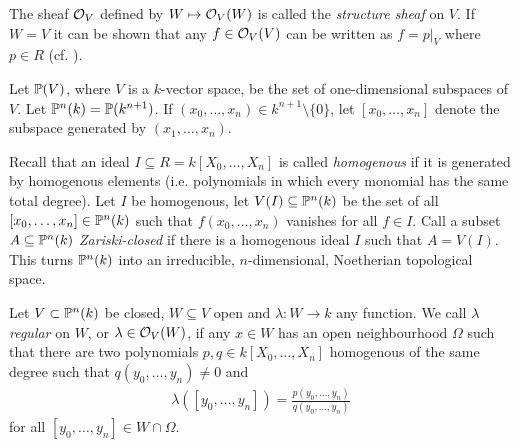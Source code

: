 \documentclass[a4paper,parskip=full,numbers=enddot]{scrreprt}
\begin{document}
\begin{defi}
\begin{example}
     The sheaf $\mathcal{O}_V$ defined by $W\mapsto \mathcal{O}_V(W)$ is called the \emph{structure sheaf} on $V$. If $W=V$ it can be shown that any $f\in \mathcal{O}_V(V)$ can be written as $f=p|_V$ where $p\in R$ (cf. \cite[Proposition 2.2.2]{alg1}).
     
    \end{example}
    
\begin{example}
    Let $\mathbb{P}(V)$, where $V$ is a $k$-vector space, be the set of one-dimensional subspaces of $V$. Let $\mathbb{P}^n(k) = \mathbb{P}(k^{n+1})$. If $(x_0,\ldots,x_n)\in k^{n+1}\setminus\{0\}$, let $[x_0,\ldots,x_n]$ denote the subspace generated by $(x_1,\ldots, x_n)$.
     
     Recall that an ideal $I\subseteq R=k[X_0,\ldots,X_n]$ is called \emph{homogenous} if it is generated by homogenous elements (i.e. polynomials in which every monomial has the same total degree). Let $I$ be homogenous, let $V(I)\subseteq \mathbb{P}^n(k)$ be the set of all $[x_0, \ldots, x_n]\in\mathbb{P}^n(k)$ such that $f(x_0,\ldots, x_n)$ vanishes for all $f\in I$. Call a subset $A\subseteq\mathbb{P}^n(k)$ \emph{Zariski-closed} if there is a homogenous ideal $I$ such that $A= V(I)$. This turns $\mathbb{P}^n(k)$ into an irreducible, $n$-dimensional, Noetherian topological space.
     
     Let $V\subset \mathbb{P}^n(k)$ be closed, $W\subseteq V$ open and $\lambda\colon W\to k$ any function. We call $\lambda$ \emph{regular} on $W$, or $\lambda \in \mathcal{O}_V(W)$, if any $x\in W$ has an open neighbourhood $\Omega$ such that there are two polynomials $p,q\in k[X_0,\ldots,X_n]$ homogenous of the same degree such that $q(y_0,\ldots,y_n) \neq 0$ and 
     \begin{align*}
     	\lambda([y_0,\ldots,y_n]) = \frac{p(y_0,\ldots,y_n)}{q(y_0,\ldots,y_n)}
     \end{align*}
     for all $[y_0,\ldots,y_n]\in W\cap \Omega$.
     

\end{example}
\end{defi}
\end{document}
